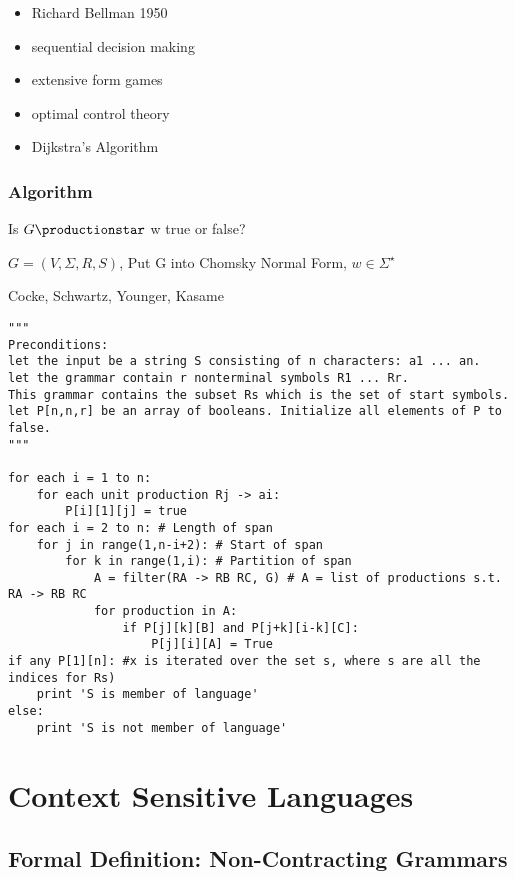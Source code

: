 \documentclass[11pt]{article}
\begin{document}
\begin{itemize}
\item Richard Bellman 1950
\item sequential decision making
\item extensive form games
\item optimal control theory
\item Dijkstra's Algorithm
\end{itemize}
\subsubsection{Algorithm}
\label{sec-3.8.2}

    Is $G \productionstar$ w true or false?
   
    $G = (V, \Sigma, R, S)$,
    Put G into Chomsky Normal Form,
    $w \in \Sigma^{ \star }$

    Cocke, Schwartz, Younger, Kasame
  

\begin{verbatim}
"""
Preconditions:
let the input be a string S consisting of n characters: a1 ... an.
let the grammar contain r nonterminal symbols R1 ... Rr.
This grammar contains the subset Rs which is the set of start symbols.
let P[n,n,r] be an array of booleans. Initialize all elements of P to false.
"""

for each i = 1 to n:
    for each unit production Rj -> ai:
        P[i][1][j] = true
for each i = 2 to n: # Length of span
    for j in range(1,n-i+2): # Start of span
        for k in range(1,i): # Partition of span
            A = filter(RA -> RB RC, G) # A = list of productions s.t. RA -> RB RC
            for production in A:
                if P[j][k][B] and P[j+k][i-k][C]:
                    P[j][i][A] = True
if any P[1][n]: #x is iterated over the set s, where s are all the indices for Rs)
    print 'S is member of language'
else:
    print 'S is not member of language'
\end{verbatim}


\section{Context Sensitive Languages}
\label{sec-4}

\subsection{Formal Definition:  Non-Contracting Grammars}
\label{sec-4.1}
\end{document}
